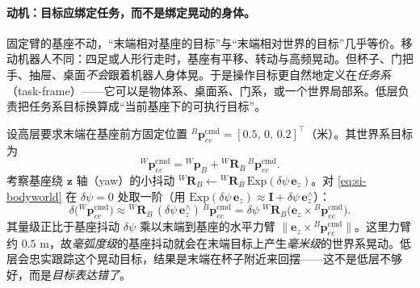 \paragraph{动机：目标应绑定任务，而不是绑定晃动的身体。}
固定臂的基座不动，“末端相对基座的目标”与“末端相对世界的目标”几乎等价。移动机器人不同：四足或人形行走时，基座有平移、转动与高频晃动。但杯子、门把手、抽屉、桌面\emph{不会}跟着机器人身体晃。于是操作目标更自然地定义在\emph{任务系}（task-frame）——它可以是物体系、桌面系、门系，或一个世界局部系。低层负责把任务系目标换算成“当前基座下的可执行目标”。

\begin{derivation}
设高层要求末端在基座前方固定位置 ${}^{B}\mathbf p_{ee}^{\mathrm{cmd}}=[0.5,\,0,\,0.2]^\top$（米）。其世界系目标为
\begin{equation}
  {}^{W}\mathbf p_{ee}^{\mathrm{cmd}}={}^{W}\mathbf p_{B}+{}^{W}\mathbf R_{B}\,{}^{B}\mathbf p_{ee}^{\mathrm{cmd}}.
  \label{eq:si-bodyworld}
\end{equation}
考察基座绕 $\mathbf z$ 轴（yaw）的小抖动 ${}^{W}\mathbf R_{B}\leftarrow{}^{W}\mathbf R_{B}\,\mathrm{Exp}(\delta\psi\,\mathbf e_z)$。对 \cref{eq:si-bodyworld} 在 $\delta\psi=0$ 处取一阶（用 $\mathrm{Exp}(\delta\psi\,\mathbf e_z)\approx\mathbf I+\delta\psi\,\mathbf e_z^\wedge$）：
\begin{equation}
  \delta\big({}^{W}\mathbf p_{ee}^{\mathrm{cmd}}\big)\approx{}^{W}\mathbf R_{B}\,(\delta\psi\,\mathbf e_z^\wedge)\,{}^{B}\mathbf p_{ee}^{\mathrm{cmd}}
  =\delta\psi\;{}^{W}\mathbf R_{B}\big(\mathbf e_z\times{}^{B}\mathbf p_{ee}^{\mathrm{cmd}}\big).
  \label{eq:si-jitter}
\end{equation}
其量级正比于基座抖动 $\delta\psi$ 乘以末端到基座的水平力臂 $\|\mathbf e_z\times{}^{B}\mathbf p_{ee}^{\mathrm{cmd}}\|$。这里力臂约 $0.5$ m，故\emph{毫弧度级}的基座抖动就会在末端目标上产生\emph{毫米级}的世界系晃动。低层会忠实跟踪这个晃动目标，结果是末端在杯子附近来回摆——这不是低层不够好，而是\emph{目标表达错了}。
\end{derivation}

